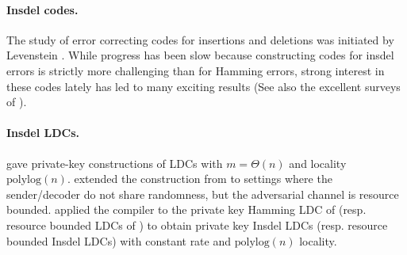 \documentclass[10pt,a4paper]{article}
\theoremstyle{remark}
\newcommand{\polylog}{\ensuremath{\mathrm{polylog}}\xspace}
\begin{document}
\paragraph{Insdel codes.} The study of error correcting codes for insertions and deletions was initiated by Levenstein \cite{Levenshtein_SPD66}. While  progress has been slow because constructing codes for insdel errors is strictly more challenging than for Hamming errors, strong interest in these codes lately has led to many exciting results  \cite{SchZuc99, Kiwi_expectedlength, guruswami2017deletion,HaeuplerS17, GuruswamiL18,HaeuplerSS18,HaeuplerS18,BrakensiekGZ18, ChengJLW18, ChengHLSW19, ChengJ0W19, GuruswamiL19,HaeuplerRS19,Haeupler19,  LiuTX20,GuruswamiHS20, ChengGHL21, ChengL21} (See also the excellent surveys of \cite{Sloane2002OnSC,Mercier2010ASO,Mitzenmachen-survey, haeupler2021synchronization}).

 

\paragraph{Insdel LDCs.} 
\cite{OPS07} gave private-key constructions of LDCs with  $m=\Theta(n)$ and locality $\polylog(n)$. \cite{BlockiKZ19} extended the construction from \cite{OPS07} to settings where the sender/decoder do not share randomness, but the adversarial channel is resource bounded. 
\cite{block2021private} applied the \cite{BlockBGKZ20} compiler to the private key Hamming LDC of \cite{OPS07} (resp. resource bounded LDCs of \cite{BlockiKZ19}) to obtain private key Insdel LDCs (resp. resource bounded Insdel LDCs) with constant rate and $\polylog(n)$ locality.
\end{document}
